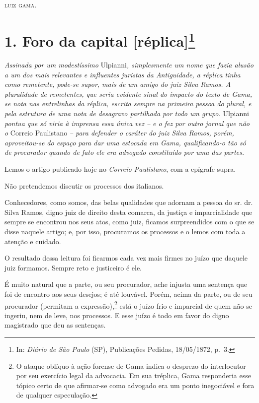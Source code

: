 {\begin{flushright}
\textsc{luiz gama}.
\end{flushright}

\chapter{1. Foro da capital {[}réplica{]}\footnote{ In: \emph{Diário de São Paulo} (SP), Publicações Pedidas,
  18/05/1872, p.~3.}} %

\begin{didascalia}
\emph{Assinada por um modestíssimo} Ulpianni\emph{, simplesmente um nome
que fazia alusão a um dos mais relevantes e influentes juristas da
Antiguidade, a réplica tinha como remetente, pode-se supor, mais de um
amigo do juiz Silva Ramos. A pluralidade de remetentes, que seria
evidente sinal do impacto do texto de Gama, se nota nas entrelinhas da
réplica, escrita sempre na primeira pessoa do plural, e pela estrutura
de uma nota de desagravo partilhada por todo um grupo.} Ulpianni
\emph{pontua que só viria à imprensa essa única vez -- e o fez por outro
jornal que não o} Correio Paulistano \emph{-- para defender o caráter do
juiz Silva Ramos, porém, aproveitou-se do espaço para dar uma estocada
em Gama, qualificando-o tão só de procurador quando de fato ele era
advogado constituído por uma das partes.}
\end{didascalia}

\asterisc{}

Lemos o artigo publicado hoje no \emph{Correio Paulistano}, com a
epígrafe supra.

Não pretendemos discutir os processos dos italianos.

Conhecedores, como somos, das belas qualidades que adornam a pessoa do
sr. dr. Silva Ramos, digno juiz de direito desta comarca, da justiça e
imparcialidade que sempre se encontrou nos seus atos, como juiz, ficamos
surpreendidos com o que se disse naquele artigo; e, por isso, procuramos
os processos e o lemos com toda a atenção e cuidado.

O resultado dessa leitura foi ficarmos cada vez mais firmes no juízo que
daquele juiz formamos. Sempre reto e justiceiro é ele.

É muito natural que a parte, ou seu procurador, ache injusta uma
sentença que foi de encontro aos seus desejos; é até louvável. Porém,
acima da parte, ou de seu procurador (permitam a expressão),\footnote{
  O ataque oblíquo à ação forense de Gama indica o desprezo do
  interlocutor por seu exercício legal da advocacia. Em sua tréplica,
  Gama responderia esse tópico certo de que afirmar-se como advogado era
  um ponto inegociável e fora de qualquer especulação.} está o juízo
frio e imparcial de quem não se ingeriu, nem de leve, nos processos. E
esse juízo é todo em favor do digno magistrado que deu as sentenças.

}
